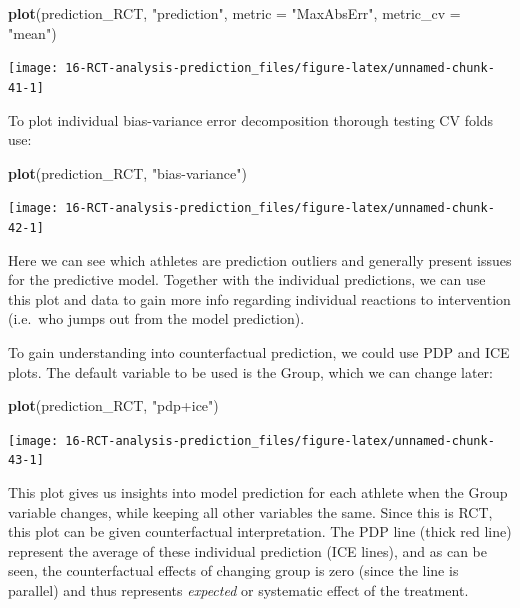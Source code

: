 \documentclass[
]{book}
\newenvironment{Shaded}{\begin{snugshade}}{\end{snugshade}}
\newcommand{\DataTypeTok}[1]{\textcolor[rgb]{0.13,0.29,0.53}{#1}}
\newcommand{\KeywordTok}[1]{\textcolor[rgb]{0.13,0.29,0.53}{\textbf{#1}}}
\newcommand{\NormalTok}[1]{#1}
\newcommand{\StringTok}[1]{\textcolor[rgb]{0.31,0.60,0.02}{#1}}
\begin{document}
\begin{Shaded}
\begin{Highlighting}[]
\KeywordTok{plot}\NormalTok{(prediction\_RCT, }\StringTok{"prediction"}\NormalTok{, }\DataTypeTok{metric =} \StringTok{"MaxAbsErr"}\NormalTok{, }\DataTypeTok{metric\_cv =} \StringTok{"mean"}\NormalTok{)}
\end{Highlighting}
\end{Shaded}

\begin{center}\texttt{[image: 16-RCT-analysis-prediction\_files/figure-latex/unnamed-chunk-41-1]} \end{center}

To plot individual bias-variance error decomposition thorough testing CV folds use:

\begin{Shaded}
\begin{Highlighting}[]
\KeywordTok{plot}\NormalTok{(prediction\_RCT, }\StringTok{"bias{-}variance"}\NormalTok{)}
\end{Highlighting}
\end{Shaded}

\begin{center}\texttt{[image: 16-RCT-analysis-prediction\_files/figure-latex/unnamed-chunk-42-1]} \end{center}

Here we can see which athletes are prediction outliers and generally present issues for the predictive model. Together with the individual predictions, we can use this plot and data to gain more info regarding individual reactions to intervention (i.e.~who jumps out from the model prediction).

To gain understanding into counterfactual prediction, we could use PDP and ICE plots. The default variable to be used is the Group, which we can change later:

\begin{Shaded}
\begin{Highlighting}[]
\KeywordTok{plot}\NormalTok{(prediction\_RCT, }\StringTok{"pdp+ice"}\NormalTok{)}
\end{Highlighting}
\end{Shaded}

\begin{center}\texttt{[image: 16-RCT-analysis-prediction\_files/figure-latex/unnamed-chunk-43-1]} \end{center}

This plot gives us insights into model prediction for each athlete when the Group variable changes, while keeping all other variables the same. Since this is RCT, this plot can be given counterfactual interpretation. The PDP line (thick red line) represent the average of these individual prediction (ICE lines), and as can be seen, the counterfactual effects of changing group is zero (since the line is parallel) and thus represents \emph{expected} or systematic effect of the treatment.
\end{document}
